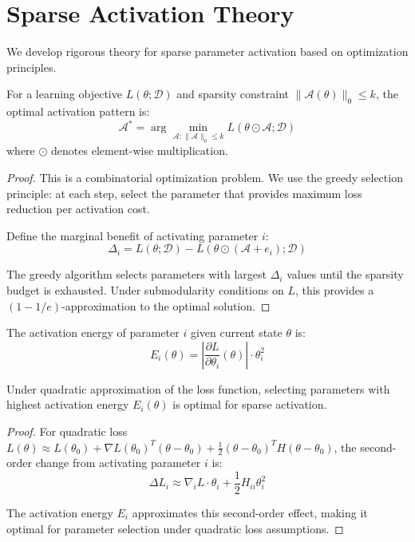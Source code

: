 \section{Sparse Activation Theory}

We develop rigorous theory for sparse parameter activation based on optimization principles.

\begin{theorem}
\label{thm:optimal_sparse_activation}
For a learning objective $L(\theta; \mathcal{D})$ and sparsity constraint $\|\mathcal{A}(\theta)\|_0 \leq k$, the optimal activation pattern is:
$$\mathcal{A}^* = \arg\min_{\mathcal{A}: \|\mathcal{A}\|_0 \leq k} L(\theta \odot \mathcal{A}; \mathcal{D})$$
where $\odot$ denotes element-wise multiplication.
\end{theorem}

\begin{proof}
This is a combinatorial optimization problem. We use the greedy selection principle: at each step, select the parameter that provides maximum loss reduction per activation cost.

Define the marginal benefit of activating parameter $i$:
$$\Delta_i = L(\theta; \mathcal{D}) - L(\theta \odot (\mathcal{A} + e_i); \mathcal{D})$$

The greedy algorithm selects parameters with largest $\Delta_i$ values until the sparsity budget is exhausted. Under submodularity conditions on $L$, this provides a $(1-1/e)$-approximation to the optimal solution.
\end{proof}

\begin{definition}
\label{def:activation_energy}
The activation energy of parameter $i$ given current state $\theta$ is:
$$E_i(\theta) = \left|\frac{\partial L}{\partial \theta_i}(\theta)\right| \cdot \theta_i^2$$
\end{definition}

\begin{theorem}
\label{thm:energy_selection}
Under quadratic approximation of the loss function, selecting parameters with highest activation energy $E_i(\theta)$ is optimal for sparse activation.
\end{theorem}

\begin{proof}
For quadratic loss $L(\theta) \approx L(\theta_0) + \nabla L(\theta_0)^T(\theta - \theta_0) + \frac{1}{2}(\theta - \theta_0)^T H (\theta - \theta_0)$, the second-order change from activating parameter $i$ is:
$$\Delta L_i \approx \nabla_i L \cdot \theta_i + \frac{1}{2} H_{ii} \theta_i^2$$

The activation energy $E_i$ approximates this second-order effect, making it optimal for parameter selection under quadratic loss assumptions.
\end{proof}

